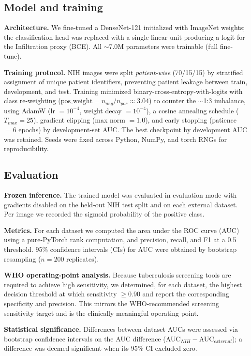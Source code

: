 \documentclass[runningheads]{llncs}
\begin{document}
\subsection{Model and training}
\textbf{Architecture.} We fine-tuned a DenseNet-121 initialized with ImageNet weights; the classification head was replaced with a single linear unit producing a logit for the Infiltration proxy (BCE). All $\sim$7.0M parameters were trainable (full fine-tune).

\textbf{Training protocol.} NIH images were split \emph{patient-wise} (70/15/15) by stratified assignment of unique patient identifiers, preventing patient leakage between train, development, and test. Training minimized binary-cross-entropy-with-logits with class re-weighting ($\mathrm{pos\_weight} = n_{neg}/n_{pos} \approx 3.04$) to counter the $\sim$1:3 imbalance, using AdamW (lr $=10^{-4}$, weight decay $=10^{-4}$), a cosine annealing schedule ($T_{max}=25$), gradient clipping (max norm $=1.0$), and early stopping (patience $=6$ epochs) by development-set AUC. The best checkpoint by development AUC was retained. Seeds were fixed across Python, NumPy, and torch RNGs for reproducibility.

\subsection{Evaluation}
\textbf{Frozen inference.} The trained model was evaluated in evaluation mode with gradients disabled on the held-out NIH test split and on each external dataset. Per image we recorded the sigmoid probability of the positive class.

\textbf{Metrics.} For each dataset we computed the area under the ROC curve (AUC) using a pure-PyTorch rank computation, and precision, recall, and F1 at a 0.5 threshold. 95\% confidence intervals (CIs) for AUC were obtained by bootstrap resampling ($n=200$ replicates).

\textbf{WHO operating-point analysis.} Because tuberculosis screening tools are required to achieve high sensitivity, we determined, for each dataset, the highest decision threshold at which sensitivity $\geq 0.90$ and report the corresponding specificity and precision. This mirrors the WHO-recommended screening sensitivity target and is the clinically meaningful operating point.

\textbf{Statistical significance.} Differences between dataset AUCs were assessed via bootstrap confidence intervals on the AUC difference (AUC$_{NIH} - $AUC$_{external}$); a difference was deemed significant when its 95\% CI excluded zero.
\end{document}
